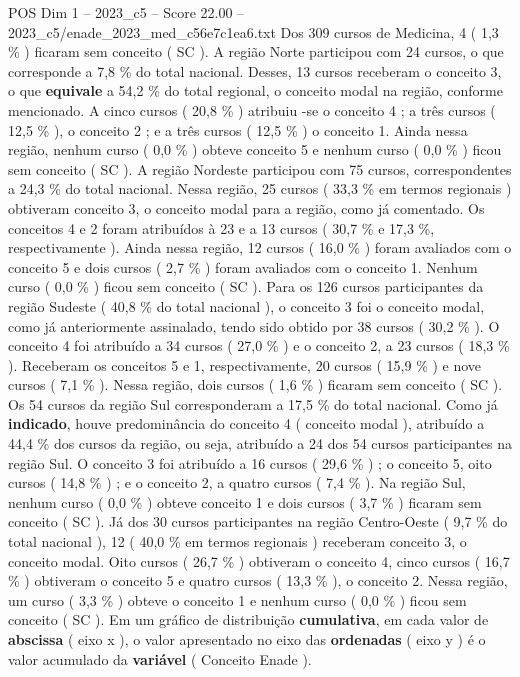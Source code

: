 \begin{textsample}{POS Dim 1 – 2023\_c5 – Score 22.00 – 2023\_c5/enade\_2023\_med\_c56e7c1ea6.txt}
Dos 309 cursos de Medicina, 4 ( 1,3 \% ) ficaram sem conceito ( SC ).
A região Norte participou com 24 cursos, o que corresponde a 7,8 \% do total nacional.
Desses, 13 cursos receberam o conceito 3, o que \textbf{equivale} a 54,2 \% do total regional, o conceito modal na região, conforme mencionado.
A cinco cursos ( 20,8 \% ) atribuiu -se o conceito 4 ; a três cursos ( 12,5 \% ), o conceito 2 ; e a três cursos ( 12,5 \% ) o conceito 1.
Ainda nessa região, nenhum curso ( 0,0 \% ) obteve conceito 5 e nenhum curso ( 0,0 \% ) ficou sem conceito ( SC ).
A região Nordeste participou com 75 cursos, correspondentes a 24,3 \% do total nacional.
Nessa região, 25 cursos ( 33,3 \% em termos regionais ) obtiveram conceito 3, o conceito modal para a região, como já comentado.
Os conceitos 4 e 2 foram atribuídos à 23 e a 13 cursos ( 30,7 \% e 17,3 \%, respectivamente ).
Ainda nessa região, 12 cursos ( 16,0 \% ) foram avaliados com o conceito 5 e dois cursos ( 2,7 \% ) foram avaliados com o conceito 1.
Nenhum curso ( 0,0 \% ) ficou sem conceito ( SC ).
Para os 126 cursos participantes da região Sudeste ( 40,8 \% do total nacional ), o conceito 3 foi o conceito modal, como já anteriormente assinalado, tendo sido obtido por 38 cursos ( 30,2 \% ).
O conceito 4 foi atribuído a 34 cursos ( 27,0 \% ) e o conceito 2, a 23 cursos ( 18,3 \% ).
Receberam os conceitos 5 e 1, respectivamente, 20 cursos ( 15,9 \% ) e nove cursos ( 7,1 \% ).
Nessa região, dois cursos ( 1,6 \% ) ficaram sem conceito ( SC ).
Os 54 cursos da região Sul corresponderam a 17,5 \% do total nacional.
Como já \textbf{indicado}, houve predominância do conceito 4 ( conceito modal ), atribuído a 44,4 \% dos cursos da região, ou seja, atribuído a 24 dos 54 cursos participantes na região Sul.
O conceito 3 foi atribuído a 16 cursos ( 29,6 \% ) ; o conceito 5, oito cursos ( 14,8 \% ) ; e o conceito 2, a quatro cursos ( 7,4 \% ).
Na região Sul, nenhum curso ( 0,0 \% ) obteve conceito 1 e dois cursos ( 3,7 \% ) ficaram sem conceito ( SC ).
Já dos 30 cursos participantes na região Centro-Oeste ( 9,7 \% do total nacional ), 12 ( 40,0 \% em termos regionais ) receberam conceito 3, o conceito modal.
Oito cursos ( 26,7 \% ) obtiveram o conceito 4, cinco cursos ( 16,7 \% ) obtiveram o conceito 5 e quatro cursos ( 13,3 \% ), o conceito 2.
Nessa região, um curso ( 3,3 \% ) obteve o conceito 1 e nenhum curso ( 0,0 \% ) ficou sem conceito ( SC ).
Em um gráfico de distribuição \textbf{cumulativa}, em cada valor de \textbf{abscissa} ( eixo x ), o valor apresentado no eixo das \textbf{ordenadas} ( eixo y ) é o valor acumulado da \textbf{variável} ( Conceito Enade ).

\end{textsample}
